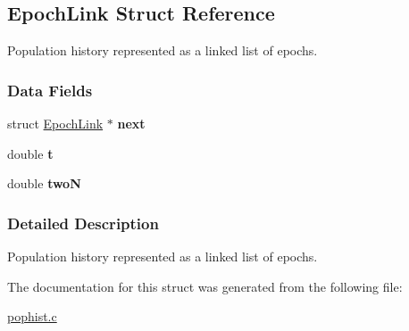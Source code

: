 \hypertarget{struct_epoch_link}{\subsection{\-Epoch\-Link \-Struct \-Reference}
\label{struct_epoch_link}
}


\-Population history represented as a linked list of epochs.  


\subsubsection*{\-Data \-Fields}
\begin{DoxyCompactItemize}
\item 
\hypertarget{struct_epoch_link_aae73dcd9c1a14b52c4c8786d34f72ee9}{struct \hyperlink{struct_epoch_link}{\-Epoch\-Link} $\ast$ {\bfseries next}}\label{struct_epoch_link_aae73dcd9c1a14b52c4c8786d34f72ee9}

\item 
\hypertarget{struct_epoch_link_a869dbdf3e43c245e275b59db7cc3c1a7}{double {\bfseries t}}\label{struct_epoch_link_a869dbdf3e43c245e275b59db7cc3c1a7}

\item 
\hypertarget{struct_epoch_link_a8f5e29b0feb499a1e7bcb4b26b2e16a4}{double {\bfseries two\-N}}\label{struct_epoch_link_a8f5e29b0feb499a1e7bcb4b26b2e16a4}

\end{DoxyCompactItemize}


\subsubsection{\-Detailed \-Description}
\-Population history represented as a linked list of epochs. 

\-The documentation for this struct was generated from the following file\-:\begin{DoxyCompactItemize}
\item 
\hyperlink{pophist_8c}{pophist.\-c}\end{DoxyCompactItemize}
